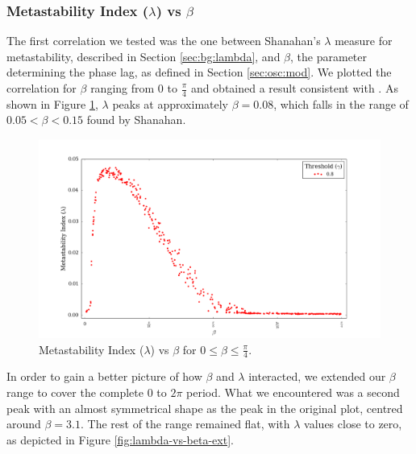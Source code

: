 \documentclass[a4paper,11pt]{article}
\begin{document}
\subsubsection{Metastability Index ($\lambda$) vs $\beta$}
\label{sec:app:osc:res:meta-v-beta}

The first correlation we tested was the one between Shanahan's $\lambda$ measure for metastability, described in Section \ref{sec:bg:lambda}, and $\beta$, the parameter determining the phase lag, as defined in Section \ref{sec:osc:mod}. We plotted the correlation for $\beta$ ranging from $0$ to $\frac{\pi}{4}$ and obtained a result consistent with \cite{Shanahan2010}. As shown in Figure \ref{fig:lambda-vs-beta-orig}, $\lambda$ peaks at approximately $\beta = 0.08$, which falls in the range of $0.05 < \beta < 0.15$ found by Shanahan.

\begin{figure}[H]
\begin{center}
\includegraphics[scale = 0.35]{figures/lambda_vs_beta_orig}
\end{center}
\caption{
	Metastability Index ($\lambda$) vs $\beta$ for $0 \leq \beta \leq \frac{\pi}{4}$.
	\label{fig:lambda-vs-beta-orig}
}
\end{figure}

In order to gain a better picture of how $\beta$ and $\lambda$ interacted, we extended our $\beta$ range to cover the complete $0$ to $2\pi$ period. What we encountered was a second peak with an almost symmetrical shape as the peak in the original plot, centred around $\beta = 3.1$. The rest of the range remained flat, with $\lambda$ values close to zero, as depicted in Figure \ref{fig:lambda-vs-beta-ext}.
\end{document}
